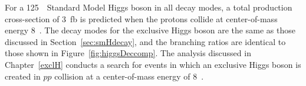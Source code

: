 \par For a 125~\GeV\ Standard Model Higgs boson in all decay modes, a total production cross-section 
of 3~fb is predicted when the protons collide at center-of-mass energy $8$~\TeV. The decay modes for the exclusive 
Higgs boson are the same as those discussed in Section~\ref{sec:smHdecay}, and the branching ratios 
are identical to those shown in Figure~\ref{fig:higgsDeccomp}. The analysis discussed in Chapter~\ref{exclH} 
conducts a search for events in which an exclusive Higgs boson is created in $pp$ collision at a center-of-mass 
energy of 8~\TeV.  

